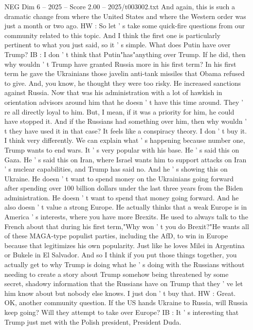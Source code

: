 \begin{textsample}{NEG Dim 6 – 2025 – Score 2.00 – 2025/t003002.txt}
And again, this is such a dramatic change from where the United States and where the Western order was just a month or two ago.
HW : So let ' s take some quick-fire questions from our community related to this topic.
And I think the first one is particularly pertinent to what you just said, so it ' s simple.
What does Putin have over Trump?
IB : I don ' t think that Putin"has"anything over Trump.
If he did, then why wouldn ' t Trump have granted Russia more in his first term?
In his first term he gave the Ukrainians those javelin anti-tank missiles that Obama refused to give.
And, you know, he thought they were too risky.
He increased sanctions against Russia.
Now that was his administration with a lot of hawkish in orientation advisors around him that he doesn ' t have this time around.
They ' re all directly loyal to him.
But, I mean, if it was a priority for him, he could have stopped it.
And if the Russians had something over him, then why wouldn ' t they have used it in that case?
It feels like a conspiracy theory.
I don ' t buy it.
I think very differently.
We can explain what ' s happening because number one, Trump wants to end wars.
It ' s very popular with his base.
He ' s said this on Gaza.
He ' s said this on Iran, where Israel wants him to support attacks on Iran ' s nuclear capabilities, and Trump has said no.
And he ' s showing this on Ukraine.
He doesn ' t want to spend money on the Ukrainians going forward after spending over 100 billion dollars under the last three years from the Biden administration.
He doesn ' t want to spend that money going forward.
And he also doesn ' t value a strong Europe.
He actually thinks that a weak Europe is in America ' s interests, where you have more Brexits.
He used to always talk to the French about that during his first term,"Why won ' t you do Brexit?"He wants all of these MAGA-type populist parties, including the AfD, to win in Europe because that legitimizes his own popularity.
Just like he loves Milei in Argentina or Bukele in El Salvador.
And so I think if you put those things together, you actually get to why Trump is doing what he ' s doing with the Russians without needing to create a story about Trump somehow being threatened by some secret, shadowy information that the Russians have on Trump that they ' ve let him know about but nobody else knows.
I just don ' t buy that.
HW : Great.
OK, another community question.
If the US hands Ukraine to Russia, will Russia keep going?
Will they attempt to take over Europe?
IB : It ' s interesting that Trump just met with the Polish president, President Duda.

\end{textsample}
